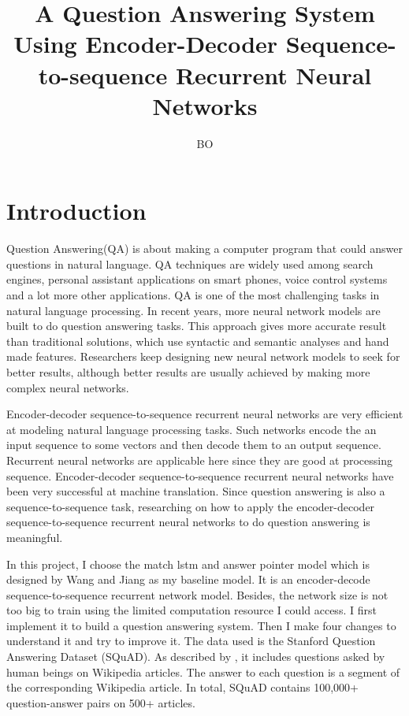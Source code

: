 \documentclass[modernstyle,12pt]{sjsuthesis}
\title{A Question Answering System Using Encoder-Decoder Sequence-to-sequence Recurrent Neural Networks}
\author{BO}{LI}
\theoremstyle{definition}
\begin{document}
\raggedright          %
\parindent=30pt       %




\chapter{Introduction}

Question Answering(QA) is about making a computer program that could answer questions in natural language. QA techniques are widely used among search engines, personal assistant applications on smart phones, voice control systems and a lot more other applications. QA is one of the most challenging tasks in natural language processing. In recent years, more neural network models are built to do question answering tasks. This approach gives more accurate result than traditional solutions, which use syntactic and semantic analyses and hand made features. Researchers keep designing new neural network models to seek for better results, although better results are usually achieved by making more complex neural networks.

Encoder-decoder sequence-to-sequence recurrent neural networks are very efficient at modeling natural language processing tasks. Such networks encode the an input sequence to some vectors and then decode them to an output sequence. Recurrent neural networks are applicable here since they are good at processing sequence. Encoder-decoder sequence-to-sequence recurrent neural networks have been very successful at machine translation. Since question answering is also a sequence-to-sequence task, researching on how to apply the encoder-decoder sequence-to-sequence recurrent neural networks to do question answering is meaningful.


In this project, I choose the match lstm and answer pointer model which is designed by Wang and Jiang\cite{wang2016machine} as my baseline model. It is an encoder-decode sequence-to-sequence recurrent network model. Besides, the network size is not too big to train using the limited computation resource I could access. I first implement it to build a question answering system. Then I make four changes to understand it and try to improve it. The data used is the Stanford Question Answering Dataset (SQuAD). As described by \cite{rajpurkar2016squad}, it includes questions asked by human beings on Wikipedia articles. The answer to each question is a segment of the corresponding Wikipedia article. In total, SQuAD contains 100,000+ question-answer pairs on 500+ articles.
\end{document}
